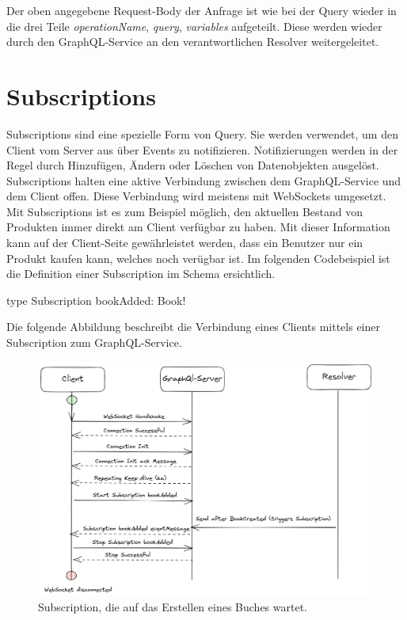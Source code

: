 Der oben angegebene Request-Body der Anfrage ist wie bei der Query wieder in die drei Teile \textit{operationName}, \textit{query}, \textit{variables} aufgeteilt.
Diese werden wieder durch den GraphQL-Service an den verantwortlichen Resolver weitergeleitet.

\section{Subscriptions}

Subscriptions sind eine spezielle Form von Query.
Sie werden verwendet, um den Client vom Server aus über Events zu notifizieren.
Notifizierungen werden in der Regel durch Hinzufügen, Ändern oder Löschen von Datenobjekten ausgelöst.
Subscriptions halten eine aktive Verbindung zwischen dem GraphQL-Service und dem Client offen.
Diese Verbindung wird meistens mit WebSockets umgesetzt.
Mit Subscriptions ist es zum Beispiel möglich, den aktuellen Bestand von Produkten immer direkt am Client verfügbar zu haben.
Mit dieser Information kann auf der Client-Seite gewährleistet werden, dass ein Benutzer nur ein Produkt kaufen kann, welches noch verügbar ist.
\newline
Im folgenden Codebeispiel ist die Definition einer Subscription im Schema ersichtlich.

\begin{JsCode}
type Subscription {
    bookAdded: Book!
}
\end{JsCode}

Die folgende Abbildung beschreibt die Verbindung eines Clients mittels einer Subscription zum GraphQL-Service.
\begin{figure}[H]
    \includegraphics[width=\textwidth]{pics/SubscriptionWebSocket.png}
    \caption{Subscription, die auf das Erstellen eines Buches wartet.}
\end{figure}

